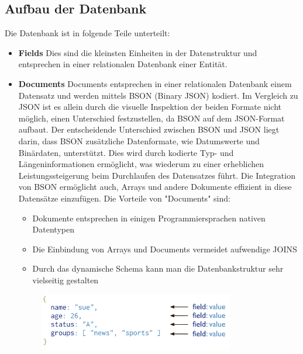 \subsection{Aufbau der Datenbank}
Die Datenbank ist in folgende Teile unterteilt:

\begin{itemize}
    \item \textbf{Fields}
        \newline
        Dies sind die kleinsten Einheiten in der Datenstruktur und entsprechen in einer relationalen Datenbank einer Entität.
    \item \textbf{Documents}
        \newline
        Documents entsprechen in einer relationalen Datenbank einem Datensatz und werden mittels BSON (Binary JSON) kodiert. Im Vergleich zu JSON ist es allein durch die visuelle Inspektion der beiden Formate nicht möglich, einen Unterschied festzustellen, da BSON auf dem JSON-Format aufbaut.
        \newline
        Der entscheidende Unterschied zwischen BSON und JSON liegt darin, dass BSON zusätzliche Datenformate, wie Datumswerte und Binärdaten, unterstützt. Dies wird durch kodierte Typ- und Längeninformationen ermöglicht, was wiederum zu einer erheblichen Leistungssteigerung beim Durchlaufen des Datensatzes führt. Die Integration von BSON ermöglicht auch, Arrays und andere Dokumente effizient in diese Datensätze einzufügen.
        \newline
        Die Vorteile von "Documents" sind:
        \begin{itemize}
            \item Dokumente entsprechen in einigen Programmiersprachen nativen Datentypen
            \item Die Einbindung von Arrays und Documents vermeidet aufwendige JOINS
            \item Durch das dynamische Schema kann man die Datenbankstruktur sehr vielseitig gestalten
        \end{itemize}
        \begin{figure}[h!]
            \centering
            \includegraphics[width=0.8\textwidth]{pics/document.png}

\end{figure}
\end{itemize}
